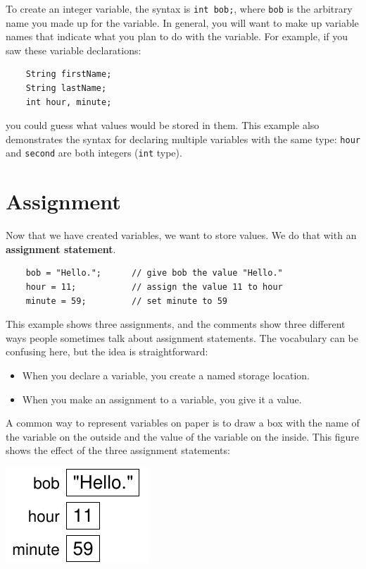 To create an integer variable, the syntax is {\tt int bob;},
where {\tt bob} is the arbitrary name you made up for the
variable.  In general, you will want to make up variable names
that indicate what you plan to do with the variable.  For
example, if you saw these variable declarations:

\begin{lstlisting}
    String firstName;
    String lastName;
    int hour, minute;
\end{lstlisting}
%
you could guess what values
would be stored in them.  This example
also demonstrates the syntax for declaring multiple variables
with the same type: {\tt hour} and {\tt second}
are both integers ({\tt int} type).

\section{Assignment}

Now that we have created variables, we want to
store values.  We do that with an {\bf assignment
statement}.

\begin{lstlisting}
    bob = "Hello.";      // give bob the value "Hello."
    hour = 11;           // assign the value 11 to hour
    minute = 59;         // set minute to 59
\end{lstlisting}
%
This example shows three assignments, and the comments show
three different ways people sometimes talk about assignment
statements.  The vocabulary can be confusing here, but the
idea is straightforward:

\begin{itemize}

\item When you declare a variable, you create a named storage location.

\item When you make an assignment to a variable, you give it a value.

\end{itemize}

A common way to represent variables on paper is to draw a box
with the name of the variable on the outside and the value
of the variable on the inside.  This figure shows
the effect of the three assignment statements:


\includegraphics{figs/assign.pdf}


